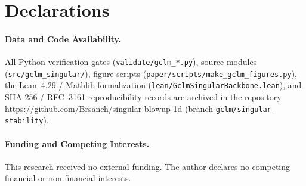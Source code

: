 \documentclass[11pt,a4paper]{article}
\begin{document}
\section*{Declarations}
\paragraph{Data and Code Availability.}
All Python verification gates (\texttt{validate/\allowbreak gclm\_*.py}), source modules (\texttt{src/\allowbreak gclm\_singular/}), figure scripts (\texttt{paper/\allowbreak scripts/\allowbreak make\_gclm\_figures.py}), the Lean~4.29 / Mathlib formalization (\texttt{lean/\allowbreak GclmSingularBackbone.lean}), and SHA-256 / RFC~3161 reproducibility records are archived in the repository \url{https://github.com/Brsanch/singular-blowup-1d} (branch \texttt{gclm/singular-stability}).

\paragraph{Funding and Competing Interests.}
This research received no external funding. The author declares no competing financial or non-financial interests.
\end{document}
